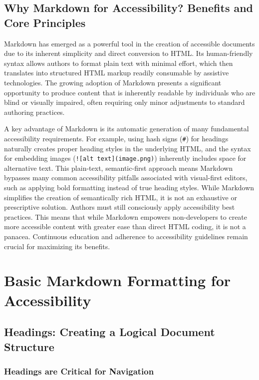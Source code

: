 \subsection{Why Markdown for Accessibility? Benefits and Core Principles}
Markdown has emerged as a powerful tool in the creation of accessible documents due to its inherent simplicity and direct conversion to HTML. \cite{SmashingMagazine} Its human-friendly syntax allows authors to format plain text with minimal effort, which then translates into structured HTML markup readily consumable by assistive technologies. \cite{SmashingMagazine} The growing adoption of Markdown presents a significant opportunity to produce content that is inherently readable by individuals who are blind or visually impaired, often requiring only minor adjustments to standard authoring practices. \cite{RMarkdownMassey}

A key advantage of Markdown is its automatic generation of many fundamental accessibility requirements. For example, using hash signs (\texttt{\#}) for headings naturally creates proper heading styles in the underlying HTML, and the syntax for embedding images (\texttt{![alt text](image.png)}) inherently includes space for alternative text. \cite{RMarkdownMassey} This plain-text, semantic-first approach means Markdown bypasses many common accessibility pitfalls associated with visual-first editors, such as applying bold formatting instead of true heading styles. \cite{UniversalDesign} While Markdown simplifies the creation of semantically rich HTML, it is not an exhaustive or prescriptive solution. \cite{SmashingMagazine} Authors must still consciously apply accessibility best practices. This means that while Markdown empowers non-developers to create more accessible content with greater ease than direct HTML coding, it is not a panacea. Continuous education and adherence to accessibility guidelines remain crucial for maximizing its benefits.

\section{Basic Markdown Formatting for Accessibility}
\label{sec:markdown-formatting}

\subsection{Headings: Creating a Logical Document Structure}
\subsubsection{Headings are Critical for Navigation}

